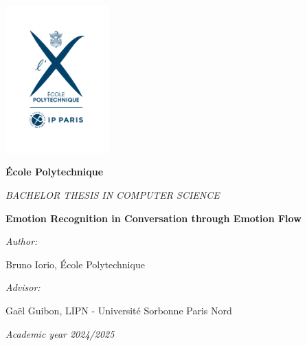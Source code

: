 \documentclass[oneside, a4paper, onecolumn, 11pt]{article}
\newcommand{\thesistitle}[0]{Emotion Recognition in Conversation through Emotion Flow}
\newcommand{\authorname}[0]{Bruno Iorio}
\newcommand{\supervisor}[0]{Gaël Guibon}
\newcommand{\supervisorinstitution}[0]{LIPN - Université Sorbonne Paris Nord}
\begin{document}



\hspace{0pt}
\vfill

\begin{center}

\includegraphics[width=0.3\textwidth]{logo-EP-vertical}

\vspace*{2em}
%
{\large
\textbf{\'Ecole Polytechnique}

\vspace*{1em}
\textit{BACHELOR THESIS IN COMPUTER SCIENCE}


\vspace*{3em}
{\Huge \textbf{\thesistitle}}
\vspace*{3em}



\textit{Author:}

\vspace*{1em}
\authorname{}, \'Ecole Polytechnique

\vspace*{2em}
%
{\textit{Advisor:}}

\vspace*{1em}
\supervisor{}, \supervisorinstitution{}
}

\vspace*{2em}
\textit{Academic year 2024/2025}

\end{center}

\vfill
\hspace{0pt}
\end{document}
